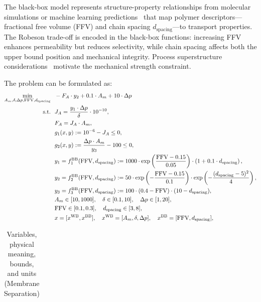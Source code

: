 \documentclass[12pt,a4paper]{article}%
\theoremstyle{plain}%
\theoremstyle{remark}%
\theoremstyle{definition}%
\def\WB{\mathrm{WB}}
\def\BB{\mathrm{BB}}
\begin{document}
\begin{appendices}
The black-box model represents structure-property relationships from molecular simulations or machine learning predictions~\cite{barnett2020designing} that map polymer descriptors---fractional free volume (FFV) and chain spacing $d_{\text{spacing}}$---to transport properties. The Robeson trade-off is encoded in the black-box functions: increasing FFV enhances permeability but reduces selectivity, while chain spacing affects both the upper bound position and mechanical integrity. Process superstructure considerations~\cite{chiwaye2025superstructure,demirel2022membrane} motivate the mechanical strength constraint.

The problem can be formulated as:
\begin{align} \label{eq:Membrane}
    \min_{A_m, \delta, \Delta p, \text{FFV}, d_{\text{spacing}}} &~~ -F_A \cdot y_2 + 0.1 \cdot A_m + 10 \cdot \Delta p \\\notag
    \text{s.t.} &~~ J_A = \frac{y_1 \cdot \Delta p}{\delta} \cdot 10^{-10}, \\\notag
    &~~ F_A = J_A \cdot A_m, \\\notag
    &~~ g_1(x, y) := 10^{-6} - J_A \leq 0, \\\notag
    &~~ g_2(x, y) := \frac{\Delta p \cdot A_m}{y_3} - 100 \leq 0, \\\notag
    &~~ y_1 = f^\BB_1(\text{FFV}, d_{\text{spacing}}) := 1000 \cdot \exp\left(\frac{\text{FFV} - 0.15}{0.05}\right) \cdot \left(1 + 0.1 \cdot d_{\text{spacing}}\right), \\\notag
    &~~ y_2 = f^\BB_2(\text{FFV}, d_{\text{spacing}}) := 50 \cdot \exp\left(-\frac{\text{FFV} - 0.15}{0.1}\right) \cdot \exp\left(-\frac{(d_{\text{spacing}} - 5)^2}{4}\right), \\\notag
    &~~ y_3 = f^\BB_3(\text{FFV}, d_{\text{spacing}}) := 100 \cdot (0.4 - \text{FFV}) \cdot (10 - d_{\text{spacing}}), \\\notag
    &~~ A_m \in [10, 1000], \quad \delta \in [0.1, 10], \quad \Delta p \in [1, 20], \\\notag
    &~~ \text{FFV} \in [0.1, 0.3], \quad d_{\text{spacing}} \in [3, 8], \\\notag
    &~~ x = [x^{\WB}, x^{\BB}], \quad x^{\WB} = [A_m, \delta, \Delta p], \quad x^{\BB} = [\text{FFV}, d_{\text{spacing}}],
\end{align}
\begin{table}[htbp]
\centering
\caption{Variables, physical meaning, bounds, and units (Membrane Separation)}
\label{tab:membrane_vars}
\begin{tabular}{@{}llll@{}}

\end{tabular}
\end{table}
\end{appendices}
\end{document}
